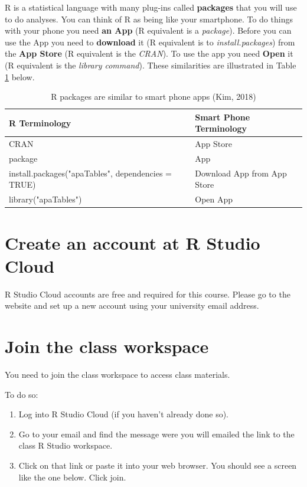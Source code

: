 \documentclass[
]{krantz}
\providecommand{\tightlist}{%
  \setlength{\itemsep}{0pt}\setlength{\parskip}{0pt}}
\begin{document}
R is a statistical language with many plug-ins called \textbf{packages} that you will use to do analyses. You can think of R as being like your smartphone. To do things with your phone you need \textbf{an App} (R equivalent is a \emph{package}). Before you can use the App you need to \textbf{download} it (R equivalent is to \emph{install.packages}) from the \textbf{App Store} (R equivalent is the \emph{CRAN}). To use the app you need \textbf{Open} it (R equivalent is the \emph{library command}). These similarities are illustrated in Table \ref{tab:appstore} below.

\begin{table}

\caption{\label{tab:appstore}R packages are similar to smart phone apps (Kim, 2018)}
\centering
\begin{tabular}[t]{ll}
\toprule
R Terminology & Smart Phone Terminology\\
\midrule
CRAN & App Store\\
package & App\\
install.packages("apaTables", dependencies = TRUE) & Download App from App Store\\
library("apaTables") & Open App\\
\bottomrule
\end{tabular}
\end{table}

\hypertarget{create-an-account-at-r-studio-cloud}{%
\section{Create an account at R Studio Cloud}\label{create-an-account-at-r-studio-cloud}}

R Studio Cloud accounts are free and required for this course. Please go to the website and set up a new account using your university email address.

\hypertarget{join-the-class-workspace}{%
\section{Join the class workspace}\label{join-the-class-workspace}}

You need to join the class workspace to access class materials.

To do so:

\begin{enumerate}
\def\labelenumi{\arabic{enumi}.}
\tightlist
\item
  Log into R Studio Cloud (if you haven't already done so).
\item
  Go to your email and find the message were you will emailed the link to the class R Studio workspace.
\item
  Click on that link or paste it into your web browser. You should see a screen like the one below. Click join.
\end{enumerate}
\end{document}
